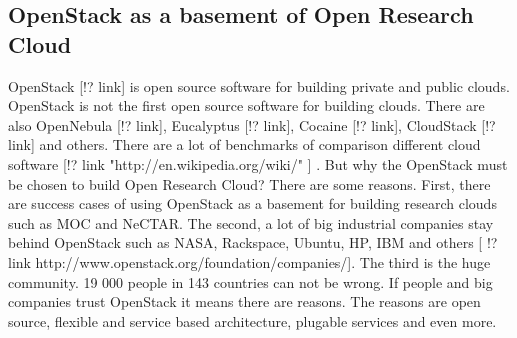 \subsection{OpenStack as a basement of Open Research Cloud}
OpenStack [!? link] is open source software for building private and public clouds. OpenStack is not the first open source software for building clouds. There are also OpenNebula [!? link], Eucalyptus [!? link], Cocaine [!? link], CloudStack [!? link] and others. There are a lot of benchmarks of comparison different cloud software [!? link "http://en.wikipedia.org/wiki/" ] . But why the OpenStack must be chosen to build Open Research Cloud? There are some reasons. First, there are success cases of using OpenStack as a basement for building research clouds such as MOC and NeCTAR. The second, a lot of big industrial companies stay behind OpenStack such as NASA, Rackspace, Ubuntu, HP, IBM and others [ !? link http://www.openstack.org/foundation/companies/]. The third is the huge community. 19 000 people in 143 countries can not be wrong. If people and big companies trust OpenStack it means there are reasons. The reasons are open source, flexible and service based architecture, plugable services and even more.  




